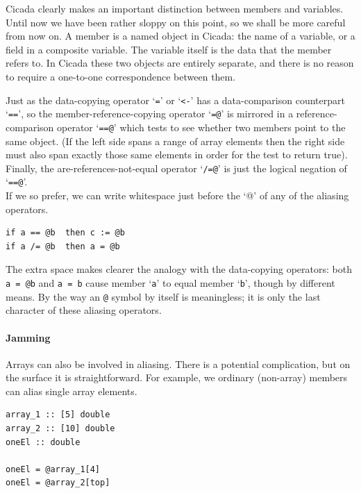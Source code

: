 \documentclass{article}
\newenvironment{code}{
       \begin{list}{}{
               \setlength{\leftmargin}{.4in}
               \setlength{\rightmargin}{0in}
               \setlength{\topsep}{.2in}
       }
       \small
       \item[] }
       { \end{list}   }
\begin{document}
Cicada clearly makes an important distinction between members and variables.  Until now we have been rather sloppy on this point, so we shall be more careful from now on.  A member is a named object in Cicada:  the name of a variable, or a field in a composite variable.  The variable itself is the data that the member refers to.  In Cicada these two objects are entirely separate, and there is no reason to require a one-to-one correspondence between them.

Just as the data-copying operator `\verb#=#' or `\verb#<-#' has a data-comparison counterpart `\verb#==#', so the member-reference-copying operator `\verb#=@#'  is mirrored in a reference-comparison operator `\verb#==@#' which tests to see whether two members point to the same object.  (If the left side spans a range of array elements then the right side must also span exactly those same elements in order for the test to return true).  Finally, the are-references-not-equal operator `\verb#/=@#' is just the logical negation of `\verb#==@#'.\\

If we so prefer, we can write whitespace just before the `@' of any of the aliasing operators.

\begin{code} \begin{verbatim}
if a == @b  then c := @b
if a /= @b  then a = @b
\end{verbatim} \end{code}

\noindent The extra space makes clearer the analogy with the data-copying operators:  both \verb#a = @b# and \verb#a = b# cause member `\verb#a#' to equal member `\verb#b#', though by different means.  By the way an \texttt{@} symbol by itself is meaningless; it is only the last character of these aliasing operators.



\paragraph{Jamming} 

Arrays can also be involved in aliasing.  There is a potential complication, but on the surface it is straightforward.  For example, we ordinary (non-array) members can alias single array elements.

\begin{code} \begin{verbatim}
array_1 :: [5] double
array_2 :: [10] double
oneEl :: double

oneEl = @array_1[4]
oneEl = @array_2[top]
\end{verbatim} \end{code}
\end{document}
